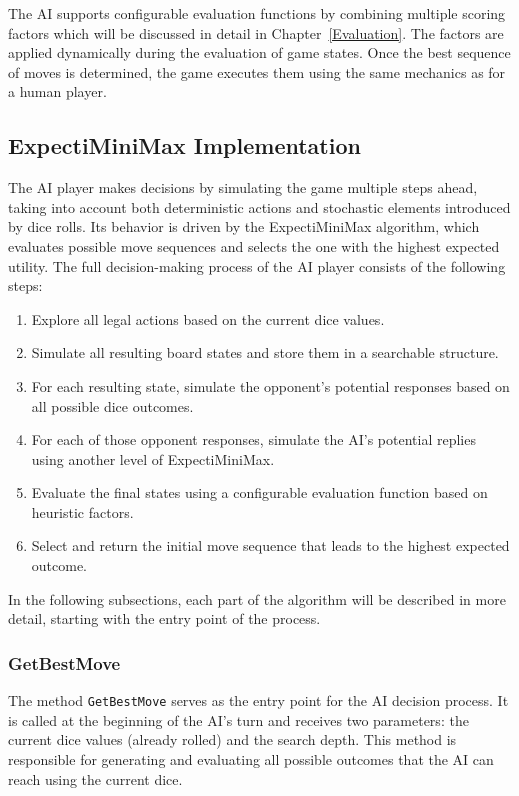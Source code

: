The AI supports configurable evaluation functions by combining multiple scoring factors which will be discussed in detail in Chapter~\ref{Evaluation}. The factors are applied dynamically during the evaluation of game states. Once the best sequence of moves is determined, the game executes them using the same mechanics as for a human player.

\subsection{ExpectiMiniMax Implementation}

The AI player makes decisions by simulating the game multiple steps ahead, taking into account both deterministic actions and stochastic elements introduced by dice rolls. Its behavior is driven by the ExpectiMiniMax algorithm, which evaluates possible move sequences and selects the one with the highest expected utility. The full decision-making process of the AI player consists of the following steps:

\begin{enumerate}
    \item Explore all legal actions based on the current dice values.
    \item Simulate all resulting board states and store them in a searchable structure.
    \item For each resulting state, simulate the opponent's potential responses based on all possible dice outcomes.
    \item For each of those opponent responses, simulate the AI's potential replies using another level of ExpectiMiniMax.
    \item Evaluate the final states using a configurable evaluation function based on heuristic factors.
    \item Select and return the initial move sequence that leads to the highest expected outcome.
\end{enumerate}

In the following subsections, each part of the algorithm will be described in more detail, starting with the entry point of the process.

\subsubsection{GetBestMove}\label{GetBestMove}

The method \texttt{GetBestMove} serves as the entry point for the AI decision process. It is called at the beginning of the AI's turn and receives two parameters: the current dice values (already rolled) and the search depth. This method is responsible for generating and evaluating all possible outcomes that the AI can reach using the current dice.

